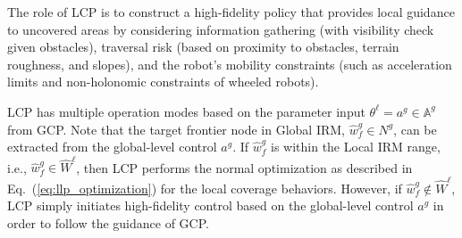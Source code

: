 \documentclass[letterpaper]{article} %
\newcommand{\phdone}[1]{} %
\begin{document}



%
%

The role of LCP is to construct a high-fidelity policy that provides local guidance to uncovered areas by considering information gathering (with visibility check given obstacles), traversal risk (based on proximity to obstacles, terrain roughness, and slopes), and the robot's mobility constraints (such as acceleration limits and non-holonomic constraints of wheeled robots).


\phdone{LCP Problem Characteristics}
LCP has multiple operation modes based on the parameter input $\theta^\ell = a^g \in \mathbb{A}^g$ from GCP. Note that the target frontier node in Global IRM, $\hat{w}^g_f \in N^g$, can be extracted from the global-level control $a^g$.
%
If $\hat{w}^g_f$ is within the Local IRM range, i.e., $\hat{w}^g_f \in \hat{W}^\ell$,  then LCP performs the normal optimization as described in Eq.~(\ref{eq:llp_optimization}) for the local coverage behaviors.
However, if $\hat{w}^g_f \notin \hat{W}^\ell$, LCP simply initiates high-fidelity control  based on the global-level control $a^g$ in order to follow the guidance of GCP.
\end{document}
